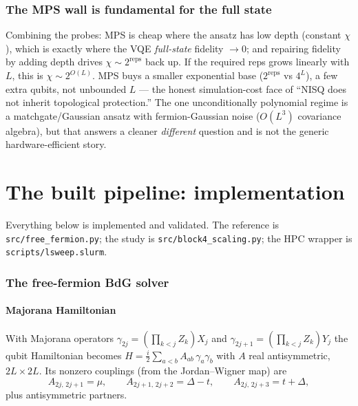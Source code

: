 \documentclass[11pt]{article}
\newcommand{\code}[1]{\texttt{#1}}
\begin{document}
\section{The MPS wall is fundamental for the full state}
Combining the probes: MPS is cheap where the ansatz has low depth
(constant $\chi$), which is exactly where the VQE \emph{full-state} fidelity
$\to0$; and repairing fidelity by adding depth drives $\chi\sim 2^{\text{reps}}$
back up. If the required reps grows linearly with $L$, this is $\chi\sim
2^{O(L)}$. MPS buys a smaller exponential base ($2^{\text{reps}}$ vs $4^L$), a
few extra qubits, not unbounded $L$ --- the honest simulation-cost face of
``NISQ does not inherit topological protection.'' The one unconditionally
polynomial regime is a matchgate/Gaussian ansatz with fermion-Gaussian noise
($O(L^3)$ covariance algebra), but that answers a cleaner \emph{different}
question and is not the generic hardware-efficient story.

\part{The built pipeline: implementation}\label{part:impl}

Everything below is implemented and validated. The reference is
\code{src/free\_fermion.py}; the study is \code{src/block4\_scaling.py}; the HPC
wrapper is \code{scripts/lsweep.slurm}.

\section{The free-fermion BdG solver}\label{sec:ff}
\subsection{Majorana Hamiltonian}
With Majorana operators $\gamma_{2j}=(\prod_{k<j}Z_k)X_j$ and
$\gamma_{2j+1}=(\prod_{k<j}Z_k)Y_j$ the qubit Hamiltonian becomes
$H=\tfrac{i}{2}\sum_{a<b}A_{ab}\,\gamma_a\gamma_b$ with $A$ real antisymmetric,
$2L\times2L$. Its nonzero couplings (from the Jordan--Wigner map) are
\[
A_{2j,\,2j+1}=\mu,\qquad
A_{2j+1,\,2j+2}=\Delta-t,\qquad
A_{2j,\,2j+3}=t+\Delta,
\]
plus antisymmetric partners.
\end{document}
